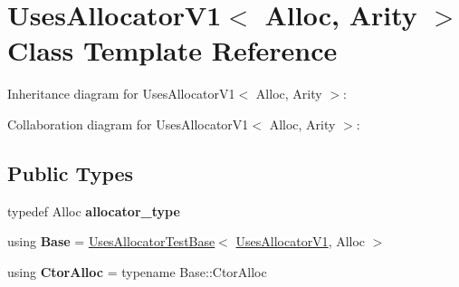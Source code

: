 \hypertarget{class_uses_allocator_v1}{}\section{Uses\+Allocator\+V1$<$ Alloc, Arity $>$ Class Template Reference}
\label{class_uses_allocator_v1}


Inheritance diagram for Uses\+Allocator\+V1$<$ Alloc, Arity $>$\+:


Collaboration diagram for Uses\+Allocator\+V1$<$ Alloc, Arity $>$\+:
\subsection*{Public Types}
\begin{DoxyCompactItemize}
\item 
\mbox{\label{class_uses_allocator_v1_a77564da599c7651a95604f934f500e65}} 
typedef Alloc {\bfseries allocator\+\_\+type}
\item 
\mbox{\label{class_uses_allocator_v1_a6aed3ff3ee952456b7cf85cf127ae180}} 
using {\bfseries Base} = \mbox{\hyperlink{struct_uses_allocator_test_base}{Uses\+Allocator\+Test\+Base}}$<$ \mbox{\hyperlink{class_uses_allocator_v1}{Uses\+Allocator\+V1}}, Alloc $>$
\item 
\mbox{\label{class_uses_allocator_v1_a9b33b743134ebb4146edc2e7c37b921f}} 
using {\bfseries Ctor\+Alloc} = typename Base\+::\+Ctor\+Alloc
\end{DoxyCompactItemize}
